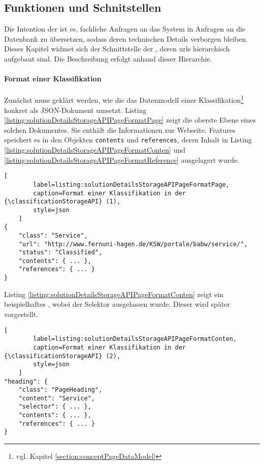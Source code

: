 \subsection{Funktionen und Schnitstellen}
    Die Intention der {\classificationStorageAPI} ist es,
    fachliche Anfragen an das System in Anfragen an die Datenbank zu übersetzen,
    sodass deren technischen Details verborgen bleiben.
    Dieses Kapitel widmet sich der Schnittstelle der {\classificationStorageAPI},
    deren \glspl{url} hierarchisch aufgebaut sind.
    Die Beschreibung erfolgt anhand dieser Hierarchie.

    \paragraph{Format einer Klassifikation}
    Zunächst muss geklärt werden, wie die {\classificationStorageAPI} das Datenmodell einer
    Klassifikation\footnote{vgl. Kapitel \ref{section:conceptPageDataModel}} konkret als JSON-Dokument umsetzt.
    Listing \ref{listing:solutionDetailsStorageAPIPageFormatPage} zeigt die oberste Ebene eines solchen Dokumentes.
    Sie enthält die Informationen zur Webseite.
    Features speichert es in den Objekten \texttt{contents} und \texttt{references},
    deren Inhalt in Listing \ref{listing:solutionDetailsStorageAPIPageFormatConten}
    und \ref{listing:solutionDetailsStorageAPIPageFormatReference} ausgelagert wurde.

    \begin{lstlisting}[
        label=listing:solutionDetailsStorageAPIPageFormatPage,
        caption=Format einer Klassifikation in der {\classificationStorageAPI} (1),
        style=json
    ]
{
    "class": "Service",
    "url": "http://www.fernuni-hagen.de/KSW/portale/babw/service/",
    "status": "Classified",
    "contents": { ... },
    "references": { ... }
}
    \end{lstlisting}

    Listing \ref{listing:solutionDetailsStorageAPIPageFormatConten}
    zeigt ein beispielhaftes {\contentFeature},
    wobei der Selektor ausgelassen wurde.
    Dieser wird später vorgestellt.

    \begin{lstlisting}[
        label=listing:solutionDetailsStorageAPIPageFormatConten,
        caption=Format einer Klassifikation in der {\classificationStorageAPI} (2),
        style=json
    ]
"heading": {
    "class": "PageHeading",
    "content": "Service",
    "selector": { ... },
    "contents": { ... },
    "references": { ... }
}
    \end{lstlisting}

